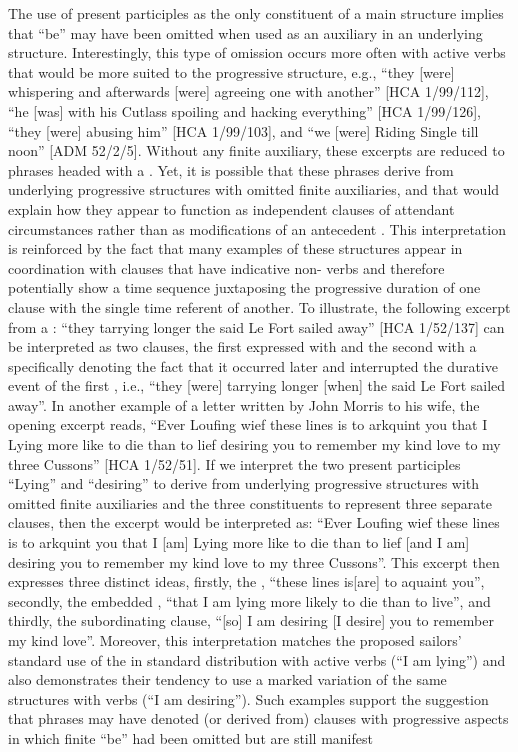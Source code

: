 The use of present participles as the only constituent of a main  structure implies that “be” may have been omitted when used as an auxiliary in an underlying  structure. Interestingly, this type of omission occurs more often with active verbs that would be more suited to the progressive  structure, e.g., “they [were] whispering and afterwards [were] agreeing one with another” [HCA 1/99/112], “he [was] with his Cutlass spoiling and hacking everything” [HCA 1/99/126], “they [were] abusing him” [HCA 1/99/103], and “we [were] Riding Single till noon” [ADM 52/2/5]. Without any finite auxiliary, these excerpts are reduced to phrases headed with a . Yet, it is possible that these phrases derive from underlying progressive  structures with omitted finite auxiliaries, and that would explain how they appear to function as independent clauses of attendant circumstances rather than as modifications of an antecedent . This interpretation is reinforced by the fact that many examples of these structures appear in coordination with clauses that have indicative non- verbs and therefore potentially show a time sequence juxtaposing the progressive duration of one clause with the single time referent of another. To illustrate, the following excerpt from a : “they tarrying longer the said Le Fort sailed away” [HCA 1/52/137] can be interpreted as two clauses, the first expressed with  and the second with a   specifically denoting the fact that it occurred later and interrupted the durative event of the first , i.e., “they [were] tarrying longer [when] the said Le Fort sailed away”.  In another example of a letter written by  John Morris to his wife, the opening excerpt reads, “Ever Loufing wief these lines is to arkquint you that I Lying more like to die than to lief desiring you to remember my kind love to my three Cussons” [HCA 1/52/51]. If we interpret the two present participles “Lying” and “desiring” to derive from underlying progressive  structures with omitted finite auxiliaries and the three  constituents to represent three separate clauses, then the excerpt would be interpreted as: “Ever Loufing wief these lines is to arkquint you that I [am] Lying more like to die than to lief [and I am] desiring you to remember my kind love to my three Cussons”. This excerpt then expresses three distinct ideas, firstly, the , “these lines is[are] to aquaint you”, secondly, the embedded , “that I am lying more likely to die than to live”, and thirdly, the subordinating clause, “[so] I am desiring [I desire] you to remember my kind love”.  Moreover, this interpretation matches the proposed sailors’ standard use of the  in standard distribution with active verbs (“I am lying”) and also demonstrates their tendency to use a marked variation of the same structures with  verbs (“I am desiring”). Such examples support the suggestion that  phrases may have denoted (or derived from) clauses with progressive aspects in which finite “be” had been omitted but are still manifest 